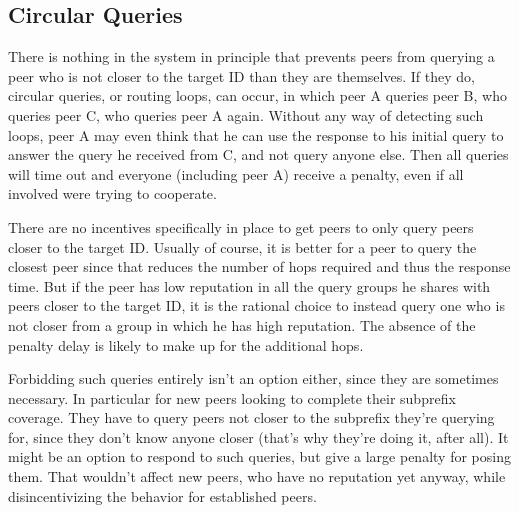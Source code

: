 \subsection{Circular Queries}
There is nothing in the system in principle that prevents peers from querying a
peer who is not closer to the target ID than they are themselves. If they do,
circular queries, or routing loops, can occur, in which peer A queries peer B,
who queries peer C, who queries peer A again. Without any way of detecting such
loops, peer A may even think that he can use the response to his initial query
to answer the query he received from C, and not query anyone else. Then all
queries will time out and everyone (including peer A) receive a penalty, even if
all involved were trying to cooperate.

There are no incentives specifically in place to get peers to only query peers
closer to the target ID. Usually of course, it is better for a peer to query the
closest peer since that reduces the number of hops required and thus the
response time. But if the peer has low reputation in all the query groups he
shares with peers closer to the target ID, it is the rational choice to instead
query one who is not closer from a group in which he has high reputation. The
absence of the penalty delay is likely to make up for the additional hops.

Forbidding such queries entirely isn't an option either, since they are
sometimes necessary. In particular for new peers looking to complete their
subprefix coverage. They have to query peers not closer to the subprefix they're
querying for, since they don't know anyone closer (that's why they're doing it,
after all). It might be an option to respond to such queries, but give a large
penalty for posing them. That wouldn't affect new peers, who have no reputation
yet anyway, while disincentivizing the behavior for established peers.
